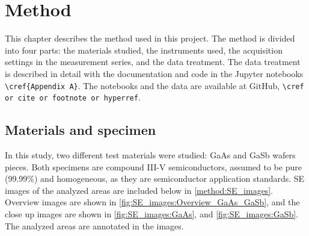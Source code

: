 \chapter{Method}
\label{ch:method}


This chapter describes the method used in this project.
The method is divided into four parts: the materials studied, the instruments used, the acquisition settings in the measurement series, and the data treatment.
The data treatment is described in detail with the documentation and code in the Jupyter notebooks \verb|\cref{Appendix A}|.
The notebooks and the data are available at GitHub, \verb|\cref or cite or footnote or hyperref|.










\section{Materials and specimen}
\label{method:materials}

In this study, two different test materials were studied: GaAs and GaSb wafers pieces.
Both specimens are compound III-V semiconductors, assumed to be pure (99.99\%) and homogeneous, as they are semiconductor application standards.
SE images of the analyzed areas are included below in \cref{method:SE_images}.
Overview images are shown in \cref{fig:SE_images:Overview_GaAs_GaSb}, and the close up images are shown in \cref{fig:SE_images:GaAs}, and \cref{fig:SE_images:GaSb}. %
The analyzed areas are annotated in the images.



